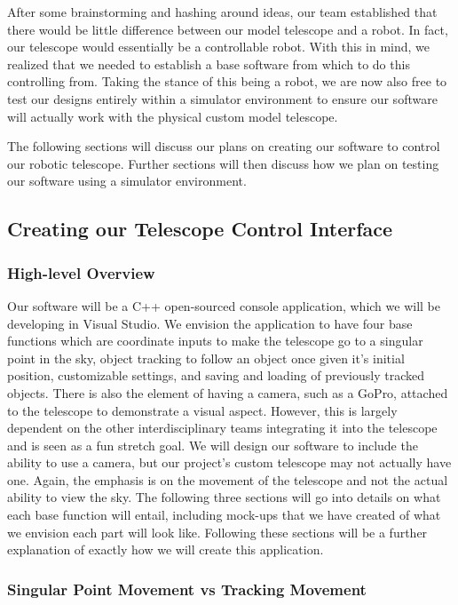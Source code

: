\documentclass[12pt]{report}
\begin{document}
After some brainstorming and hashing around ideas, our team established that there would be little difference between our model telescope and a robot. In fact, our telescope would essentially be a controllable robot. With this in mind, we realized that we needed to establish a base software from which to do this controlling from. Taking the stance of this being a robot, we are now also free to test our designs entirely within a simulator environment to ensure our software will actually work with the physical custom model telescope.

The following sections will discuss our plans on creating our software to control our robotic telescope. Further sections will then discuss how we plan on testing our software using a simulator environment.

\subsection*{Creating our Telescope Control Interface}

\subsubsection*{High-level Overview}

Our software will be a C++ open-sourced console application, which we will be developing in Visual Studio. We envision the application to have four base functions which are coordinate inputs to make the telescope go to a singular point in the sky, object tracking to follow an object once given it's initial position, customizable settings, and saving and loading of previously tracked objects. There is also the element of having a camera, such as a GoPro, attached to the telescope to demonstrate a visual aspect. However, this is largely dependent on the other interdisciplinary teams integrating it into the telescope and is seen as a fun stretch goal. We will design our software to include the ability to use a camera, but our project's custom telescope may not actually have one. Again, the emphasis is on the movement of the telescope and not the actual ability to view the sky. The following three sections will go into details on what each base function will entail, including mock-ups that we have created of what we envision each part will look like. Following these sections will be a further explanation of exactly how we will create this application.

\subsubsection*{Singular Point Movement vs Tracking Movement}
\end{document}
